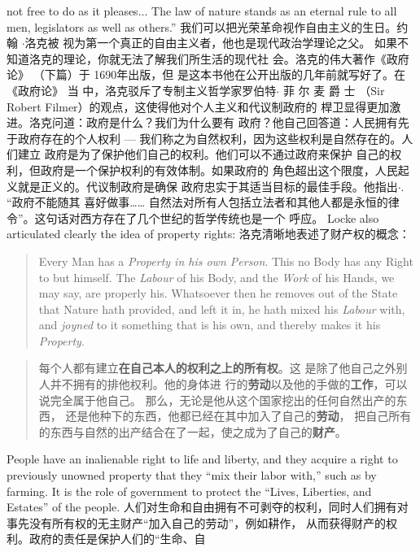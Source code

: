 \begin{paracol}{2}
not free to do as it pleases$\ldots$ The law of nature stands as an
eternal rule to all men, legislators as well as others.''
\switchcolumn
我们可以把光荣革命视作自由主义的生日。约 翰 $\cdot$洛克被
视为第一个真正的自由主义者，他也是现代政治学理论之父。
如果不知道洛克的理论，你就无法了解我们所生活的现代社
会。洛克的伟大著作《政府论》 （下篇）于 1690年出版，但
是这本书他在公开出版的几年前就写好了。在 《政府论》 当
中，洛克驳斥了专制主义哲学家罗伯特$\cdot$ 菲 尔 麦 爵 士 （Sir
Robert Filmer）的观点，这使得他对个人主义和代议制政府的
桿卫显得更加激进。洛克问道：政府是什么？我们为什么要有
政府？他自己回答道：人民拥有先于政府存在的个人权利 ---
我们称之为自然权利，因为这些权利是自然存在的。人们建立
政府是为了保护他们自己的权利。他们可以不通过政府来保护
自己的权利，但政府是一个保护权利的有效体制。如果政府的
角色超出这个限度，人民起义就是正义的。代议制政府是确保
政府忠实于其适当目标的最佳手段。他指出$\cdot$. “政府不能随其
喜好做事…… 自然法对所有人包括立法者和其他人都是永恒的律令”。这句话对西方存在了几个世纪的哲学传统也是一个
呼应。
\switchcolumn*
Locke also articulated clearly the idea of property rights:
\switchcolumn
洛克清晰地表述了财产权的概念：
\switchcolumn*
\begin{quote}
Every Man has a \textit{Property in his own Person}. This no Body has any
Right to but himself. The \textit{Labour} of his Body, and the \textit{Work} of his
Hands, we may say, are properly his. Whatsoever then he removes out of the State that Nature hath provided, and left it in,
he hath mixed his \textit{Labour} with, and \textit{joyned} to it something that is
his own, and thereby makes it his \textit{Property}.
\end{quote}
\switchcolumn
\begin{quote}
每个人都有建立\textbf{在自己本人的权利之上的所有权}。这
是除了他自己之外别人并不拥有的排他权利。他的身体进
行的\textbf{劳动}以及他的手做的\textbf{工作}，可以说完全属于他自己。
那么，无论是他从这个国家挖出的任何自然出产的东西，
还是他种下的东西，他都已经在其中加入了自己的\textbf{劳动}，
把自己所有的东西与自然的出产结合在了一起，使之成为了自己的\textbf{财产}。
\end{quote}
\switchcolumn*
People have an inalienable right to life and liberty, and they acquire a right to previously unowned property that they ``mix their labor with,'' such as by farming. It is the role of government to protect the ``Lives, Liberties, and Estates'' of the people.
\switchcolumn
人们对生命和自由拥有不可剥夺的权利，同时人们拥有对
事先没有所有权的无主财产“加入自己的劳动”，例如耕作，
从而获得财产的权利。政府的责任是保护人们的“生命、自

\end{paracol}
